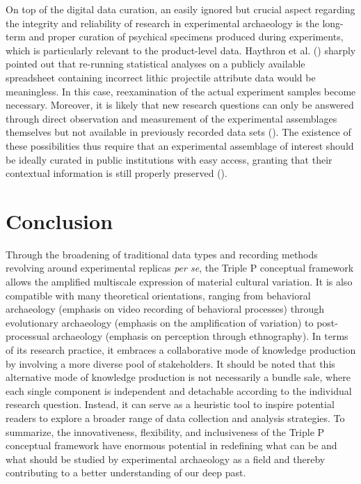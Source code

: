 \documentclass[
  11pt,
  letterpaper,
  DIV=11,
  numbers=noendperiod]{scrartcl}
\begin{document}
On top of the digital data curation, an easily ignored but crucial
aspect regarding the integrity and reliability of research in
experimental archaeology is the long-term and proper curation of
psychical specimens produced during experiments, which is particularly
relevant to the product-level data. Haythron et al.
() sharply pointed out that re-running
statistical analyses on a publicly available spreadsheet containing
incorrect lithic projectile attribute data would be meaningless. In this
case, reexamination of the actual experiment samples become necessary.
Moreover, it is likely that new research questions can only be answered
through direct observation and measurement of the experimental
assemblages themselves but not available in previously recorded data
sets (). The existence of
these possibilities thus require that an experimental assemblage of
interest should be ideally curated in public institutions with easy
access, granting that their contextual information is still properly
preserved ().

\section{Conclusion}\label{conclusion}

Through the broadening of traditional data types and recording methods
revolving around experimental replicas \emph{per se}, the Triple P
conceptual framework allows the amplified multiscale expression of
material cultural variation. It is also compatible with many theoretical
orientations, ranging from behavioral archaeology (emphasis on video
recording of behavioral processes) through evolutionary archaeology
(emphasis on the amplification of variation) to post-processual
archaeology (emphasis on perception through ethnography). In terms of
its research practice, it embraces a collaborative mode of knowledge
production by involving a more diverse pool of stakeholders. It should
be noted that this alternative mode of knowledge production is not
necessarily a bundle sale, where each single component is independent
and detachable according to the individual research question. Instead,
it can serve as a heuristic tool to inspire potential readers to explore
a broader range of data collection and analysis strategies. To
summarize, the innovativeness, flexibility, and inclusiveness of the
Triple P conceptual framework have enormous potential in redefining what
can be and what should be studied by experimental archaeology as a field
and thereby contributing to a better understanding of our deep past.
\end{document}
